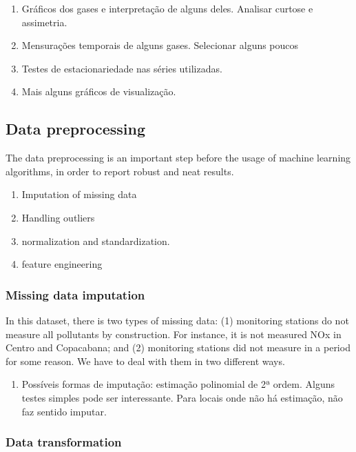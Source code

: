 \begin{enumerate}
    \item Gráficos dos gases e interpretação de alguns deles. Analisar curtose
    e assimetria.
    \item Mensurações temporais de alguns gases. Selecionar alguns poucos
    \item Testes de estacionariedade nas séries utilizadas. 
    \item Mais alguns gráficos de visualização. 
\end{enumerate}

\subsection{Data preprocessing}
\label{sec:data-preprocessing}

The data preprocessing is an important step before the usage of machine
learning algorithms, in order to report robust and neat results. 

\begin{enumerate}
    \item Imputation of missing data
    \item Handling outliers
    \item normalization and standardization. 
    \item feature engineering
\end{enumerate}

\subsubsection{Missing data imputation}

In this dataset, there is two types of missing data: (1) monitoring stations
do not measure all pollutants by construction. For instance, it is not
measured NOx in Centro and Copacabana; and (2) monitoring stations did not
measure in a period for some reason. We have to deal with them in two
different ways. 

\begin{enumerate}
    \item Possíveis formas de imputação: estimação polinomial de 2ª ordem.
    Alguns testes simples pode ser interessante. Para locais onde não há
    estimação, não faz sentido imputar. 
\end{enumerate}

\subsubsection{Data transformation}

